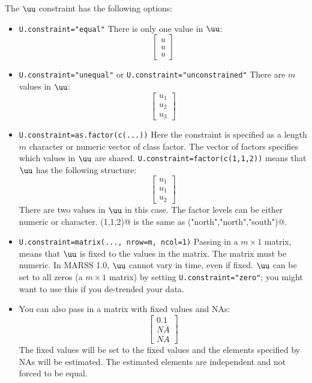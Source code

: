 The $\uu$ constraint has the following options:
\begin{itemize}\itemsep5pt
\item[] \texttt{U.constraint="equal"} There is only one value in $\uu$:
\begin{equation*}
 \left[ \begin{array}{c}
    u \\
    u \\
    u \end{array} \right]
\end{equation*}

\item[] \texttt{U.constraint="unequal"} or \texttt{U.constraint="unconstrained"} There are $m$ values in $\uu$: 
\begin{equation*}
 \left[ \begin{array}{c}
    u_1\\
    u_2\\
    u_3 \end{array} \right]
\end{equation*}

\item[] \texttt{U.constraint=as.factor(c(...))} Here the constraint is specified as a length $m$ character or numeric vector of class factor.  The vector of factors specifies which values in $\uu$ are shared.  \texttt{U.constraint=factor(c(1,1,2))} means that $\uu$ has the following structure:
\begin{equation*}
 \left[ \begin{array}{c}
    u_1 \\
    u_1 \\
    u_2 \end{array} \right]
\end{equation*}
There are two values in $\uu$ in this case.  The factor levels can be either numeric or character.  \verb@c(1,1,2)@ is the same as \verb@c("north","north","south")@.

\item[] \texttt{U.constraint=matrix(..., nrow=m, ncol=1)} Passing in a $m \times 1$ matrix, means that $\uu$ is fixed to the values in the matrix. The matrix must be numeric.  In MARSS 1.0, $\uu$ cannot vary in time, even if fixed.  $\uu$ can be set to all zeros (a $m \times 1$ matrix) by setting \texttt{U.constraint="zero"}; you might want to use this if you de-trended your data.  

\item[] You can also pass in a matrix with fixed values and NAs: 
\begin{equation*}
 \left[ \begin{array}{c}
    0.1 \\
    NA \\
    NA \end{array} \right]
\end{equation*}
The fixed values will be set to the fixed values and the elements specified by NAs will be estimated.  The estimated elements are independent and not forced to be equal.

\end{itemize}

